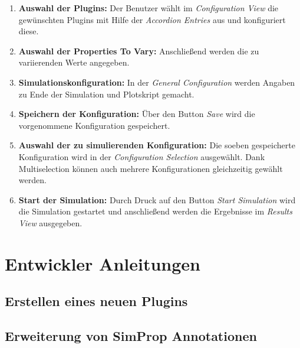 \documentclass[a4paper, 11pt]{article} %
\begin{document}
\begin{enumerate}
\item \textbf{Auswahl der Plugins:} \newline Der Benutzer wählt im \emph{Configuration View} die gewünschten Plugins mit Hilfe der \emph{Accordion Entries} aus und konfiguriert diese.
\item \textbf{Auswahl der Properties To Vary:} \newline Anschließend werden die zu variierenden Werte angegeben.
\item \textbf{Simulationskonfiguration:} \newline In der \emph{General Configuration} werden Angaben zu Ende der Simulation und Plotskript gemacht.
\item \textbf{Speichern der Konfiguration:} \newline Über den Button \emph{Save} wird die vorgenommene Konfiguration gespeichert.
\item \textbf{Auswahl der zu simulierenden Konfiguration:} \newline Die soeben gespeicherte Konfiguration wird in der \emph{Configuration Selection} ausgewählt. Dank Multiselection können auch mehrere Konfigurationen gleichzeitig gewählt werden.
\item \textbf{Start der Simulation:} \newline Durch Druck auf den Button \emph{Start Simulation} wird die Simulation gestartet und anschließend werden die Ergebnisse im \emph{Results View} ausgegeben. 
\end{enumerate}

\section{Entwickler Anleitungen} %
\label{sec:entwicklung}

\subsection{Erstellen eines neuen Plugins} %
\label{sub:neues_plugin}

\subsection{Erweiterung von SimProp Annotationen} %
\label{sub:erweiterung_von_simulation_property_annotationen}




% 
% 

\end{document}
